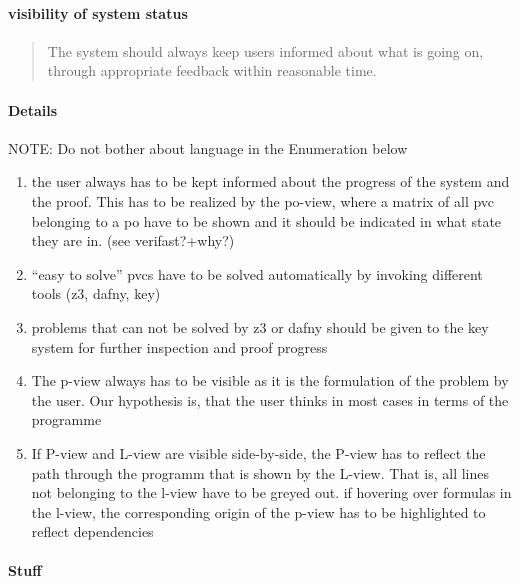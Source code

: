\documentclass{article}
\begin{document}
\paragraph{ visibility of system status}
\begin{quote}
 The system should always keep users informed about what is going on, through 
appropriate feedback within reasonable time.
\end{quote}

\paragraph{Details}
NOTE: Do not bother about language in the Enumeration below
\begin{enumerate}
\item the user always has to be kept informed about the progress of the system 
and the proof. This has to be realized by the po-view, where a matrix of all 
pvc belonging to a po have to be shown and it should be indicated in what state
 they are in. (see verifast?+why?)
\item ``easy to solve'' pvcs have to be solved automatically by invoking 
different tools (z3, dafny, key)
\item problems that can not be solved by z3 or dafny should be given to the key 
system for further inspection and proof progress
 \item The  p-view always has to be visible as it is the formulation of the 
problem by the user. Our hypothesis is, that the user thinks in most cases in 
terms of the programme 
 \item If P-view and L-view are 
visible side-by-side, the P-view has to reflect the path through the programm 
that is shown by the L-view. That is, all lines not belonging to the l-view 
have to be greyed out. if hovering over formulas in the l-view, the 
corresponding origin of the p-view has to be highlighted to reflect dependencies

\end{enumerate}


\paragraph{Stuff}
\end{document}
